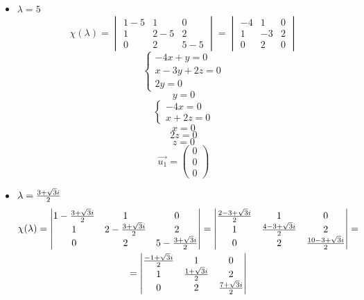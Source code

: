 \begin{itemize}
	\item $ \lambda = 5 $
    $$ \chi(\lambda) =
    \begin{vmatrix}
        1 - 5 & 1 & 0 \\
        1 & 2 - 5 & 2 \\
        0 & 2 & 5 - 5
    \end{vmatrix} =
    \begin{vmatrix}
        -4 & 1 & 0 \\
        1 & -3 & 2 \\
        0 & 2 & 0
    \end{vmatrix} $$
    $$
    \begin{cases}
    	-4x + y = 0 \\
        x - 3y + 2z = 0 \\
        2y = 0
    \end{cases} $$
    $$ y = 0 $$
    $$
    \begin{cases}
    	-4x = 0 \\
        x + 2z = 0
    \end{cases} $$
    $$ x = 0 $$
    $$ 2z = 0 $$
    $$ z = 0 $$
    $$ \vec{u_1} =
    \begin{pmatrix}
    	0 \\
        0 \\
        0
    \end{pmatrix} $$
    \item $ \lambda = \half[3 + \sqrt3i] $
    \begin{multline*}
        \chi(\lambda) =
        \begin{vmatrix}
            1 - \half[3 + \sqrt3i] & 1 & 0 \\
            1 & 2 - \half[3 + \sqrt3i] & 2 \\
            0 & 2 & 5 - \half[3 + \sqrt3i]
        \end{vmatrix} =
        \begin{vmatrix}
            \half[2 - 3 + \sqrt3i] & 1 & 0 \\
            1 & \half[4 - 3 + \sqrt3i] & 2 \\
            0 & 2 & \half[10 - 3 + \sqrt3i]
        \end{vmatrix} = \\
        =
        \begin{vmatrix}
            \half[-1 + \sqrt3i] & 1 & 0 \\
            1 & \half[1 + \sqrt3i] & 2 \\
            0 & 2 & \half[7 + \sqrt3i]

\end{vmatrix}
\end{multline*}
\end{itemize}
